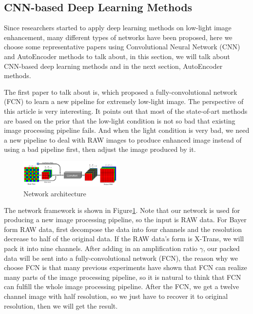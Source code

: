 \documentclass[10pt,twocolumn,letterpaper]{article}
\begin{document}
\subsection{CNN-based Deep Learning Methods}
Since researchers started to apply deep learning methods on low-light image enhancement, many different types of networks have been proposed, here we choose some representative papers using Convolutional Neural Network (CNN) and AutoEncoder methods to talk about, in this section, we will talk about CNN-based deep learning methods and in the next section, AutoEncoder methods. 

The first paper to talk about is\cite{chen2018learning}, which proposed a fully-convolutional network (FCN) to learn a new pipeline for extremely low-light image. The perspective of this article is very interesting. It points out that most of the state-of-art methods are based on the prior that the low-light condition is not so bad that existing image processing pipeline fails. And when the light condition is very bad, we need a new pipeline to deal with RAW images to produce enhanced image instead of using a bad pipeline first, then adjust the image produced by it.

\begin{figure}[t]
    \centering
    \includegraphics[width=0.45\textwidth]{latex/new_pipeline.png}
    \caption{Network architecture \cite{chen2018learning}}
    \label{fig:newPipeline}
\end{figure}
The network framework is shown in Figure\ref{fig:newPipeline}. Note that our network is used for producing a new image processing pipeline, so the input is RAW data. For Bayer form RAW data, first decompose the data into four channels and the resolution decrease to half of the original data. If the RAW data's form is X-Trans, we will pack it into nine channels. After adding in an amplification ratio $\gamma$, our packed data will be sent into a fully-convolutional network (FCN), the reason why we choose FCN is that many previous experiments have shown that FCN can realize many parts of the image processing pipeline, so it is natural to think that FCN can fulfill the whole image processing pipeline. After the FCN, we get a twelve channel image with half resolution, so we just have to recover it to original resolution, then we will get the result.
\end{document}
